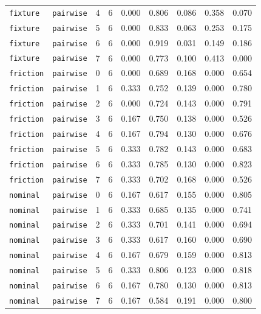 \documentclass{article}
\begin{document}
\begin{center}
\begin{tabular}{lllcccccc}
\texttt{fixture} & \texttt{pairwise} & 4 & 6 & 0.000 & 0.806 & 0.086 & 0.358 & 0.070 \\
\texttt{fixture} & \texttt{pairwise} & 5 & 6 & 0.000 & 0.833 & 0.063 & 0.253 & 0.175 \\
\texttt{fixture} & \texttt{pairwise} & 6 & 6 & 0.000 & 0.919 & 0.031 & 0.149 & 0.186 \\
\texttt{fixture} & \texttt{pairwise} & 7 & 6 & 0.000 & 0.773 & 0.100 & 0.413 & 0.000 \\
\texttt{friction} & \texttt{pairwise} & 0 & 6 & 0.000 & 0.689 & 0.168 & 0.000 & 0.654 \\
\texttt{friction} & \texttt{pairwise} & 1 & 6 & 0.333 & 0.752 & 0.139 & 0.000 & 0.780 \\
\texttt{friction} & \texttt{pairwise} & 2 & 6 & 0.000 & 0.724 & 0.143 & 0.000 & 0.791 \\
\texttt{friction} & \texttt{pairwise} & 3 & 6 & 0.167 & 0.750 & 0.138 & 0.000 & 0.526 \\
\texttt{friction} & \texttt{pairwise} & 4 & 6 & 0.167 & 0.794 & 0.130 & 0.000 & 0.676 \\
\texttt{friction} & \texttt{pairwise} & 5 & 6 & 0.333 & 0.782 & 0.143 & 0.000 & 0.683 \\
\texttt{friction} & \texttt{pairwise} & 6 & 6 & 0.333 & 0.785 & 0.130 & 0.000 & 0.823 \\
\texttt{friction} & \texttt{pairwise} & 7 & 6 & 0.333 & 0.702 & 0.168 & 0.000 & 0.526 \\
\texttt{nominal} & \texttt{pairwise} & 0 & 6 & 0.167 & 0.617 & 0.155 & 0.000 & 0.805 \\
\texttt{nominal} & \texttt{pairwise} & 1 & 6 & 0.333 & 0.685 & 0.135 & 0.000 & 0.741 \\
\texttt{nominal} & \texttt{pairwise} & 2 & 6 & 0.333 & 0.701 & 0.141 & 0.000 & 0.694 \\
\texttt{nominal} & \texttt{pairwise} & 3 & 6 & 0.333 & 0.617 & 0.160 & 0.000 & 0.690 \\
\texttt{nominal} & \texttt{pairwise} & 4 & 6 & 0.167 & 0.679 & 0.159 & 0.000 & 0.813 \\
\texttt{nominal} & \texttt{pairwise} & 5 & 6 & 0.333 & 0.806 & 0.123 & 0.000 & 0.818 \\
\texttt{nominal} & \texttt{pairwise} & 6 & 6 & 0.167 & 0.780 & 0.130 & 0.000 & 0.813 \\
\texttt{nominal} & \texttt{pairwise} & 7 & 6 & 0.167 & 0.584 & 0.191 & 0.000 & 0.800 \\
\bottomrule
\end{tabular}
\end{center}
\end{document}
